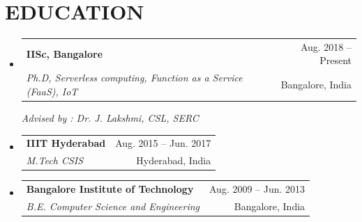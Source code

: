 \documentclass[letterpaper,11pt]{article}
\makeatletter
\newcommand{\resumeItem}[1]{
	\item\small{
		{#1 \vspace{-1pt}}
	}
}
\newcommand{\resumeSubheading}[4]{
	\vspace{-1pt}\item
	\begin{tabular*}{\textwidth}[t]{l@{\extracolsep{\fill}}r}
		\textbf{#1} & {\color{dark-grey}\small #2}\vspace{1pt}\\ %
		\textit{#3} & {\color{dark-grey} \small #4}\\ %
	\end{tabular*}\vspace{-4pt}
}
\newcommand{\resumeSubHeadingListStart}{\begin{itemize}[leftmargin=0in, label={}]}
\newcommand{\resumeSubHeadingListEnd}{\end{itemize}}
\newcommand{\resumeItemListStart}{\begin{itemize}}
\newcommand{\resumeItemListEnd}{\end{itemize}\vspace{0pt}}
\makeatother
\begin{document}
	\section {EDUCATION}
	\resumeSubHeadingListStart
	\resumeSubheading {IISc, Bangalore} {Aug. 2018 -- Present}
	{Ph.D, Serverless computing, Function as a Service (FaaS), IoT}
	{Bangalore, India}
	{\textit{Advised by : Dr. J. Lakshmi, CSL, SERC}}
	
	
	\resumeSubheading
	{IIIT Hyderabad}{Aug. 2015 -- Jun. 2017}
	{M.Tech CSIS}{Hyderabad, India}
	
	\resumeSubheading
	{Bangalore Institute of Technology}{Aug. 2009 -- Jun. 2013}
	{B.E. Computer Science and Engineering}{Bangalore, India}	
	
	\resumeSubHeadingListEnd
	
%	
	
	
%		
	

	
	
	
\end{document}
